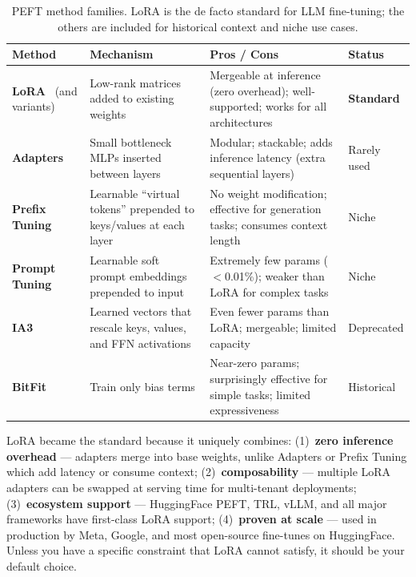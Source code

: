 \begin{table}[ht!]
\centering
\caption{PEFT method families. LoRA is the de facto standard for LLM fine-tuning; the others are included for historical context and niche use cases.}
\begin{tabular}{@{}lp{3.5cm}p{3.5cm}p{4cm}@{}}
\toprule
\textbf{Method} & \textbf{Mechanism} & \textbf{Pros / Cons} & \textbf{Status} \\
\midrule
\textbf{LoRA}~\cite{hu2021lora} (and variants) & Low-rank matrices added to existing weights & Mergeable at inference (zero overhead); well-supported; works for all architectures & \textbf{Standard} \\
\textbf{Adapters}~\cite{houlsby2019adapters} & Small bottleneck MLPs inserted between layers & Modular; stackable; adds inference latency (extra sequential layers) & Rarely used \\
\textbf{Prefix Tuning}~\cite{li2021prefix} & Learnable ``virtual tokens'' prepended to keys/values at each layer & No weight modification; effective for generation tasks; consumes context length & Niche \\
\textbf{Prompt Tuning}~\cite{lester2021prompt} & Learnable soft prompt embeddings prepended to input & Extremely few params ($<$0.01\%); weaker than LoRA for complex tasks & Niche \\
\textbf{IA3}~\cite{liu2022ia3} & Learned vectors that rescale keys, values, and FFN activations & Even fewer params than LoRA; mergeable; limited capacity & Deprecated \\
\textbf{BitFit}~\cite{zaken2022bitfit} & Train only bias terms & Near-zero params; surprisingly effective for simple tasks; limited expressiveness & Historical \\
\bottomrule
\end{tabular}
\end{table}

\begin{intuitionbox}
LoRA became the standard because it uniquely combines: (1)~\textbf{zero inference overhead} --- adapters merge into base weights, unlike Adapters or Prefix Tuning which add latency or consume context; (2)~\textbf{composability} --- multiple LoRA adapters can be swapped at serving time for multi-tenant deployments; (3)~\textbf{ecosystem support} --- HuggingFace PEFT, TRL, vLLM, and all major frameworks have first-class LoRA support; (4)~\textbf{proven at scale} --- used in production by Meta, Google, and most open-source fine-tunes on HuggingFace. Unless you have a specific constraint that LoRA cannot satisfy, it should be your default choice.
\end{intuitionbox}

